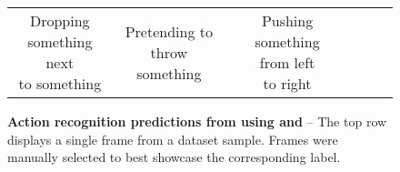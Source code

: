 \begin{figure*}[t]
\begin{tabular}{cccccc}
    \makecell{Dropping\\something next\\to something} &
    \makecell{Pretending to\\throw something} &
    \makecell{Pushing something\\from left\\to right} \\[10mm]
\end{tabular}
\vspace{-5mm}
\caption{
\textbf{Action recognition predictions from \Tssv using \iwalt and \vwalt} -- The top row displays a single frame from a dataset sample. Frames were manually selected to best showcase the corresponding label.
}
\vspace{-4mm}
\label{fig:qualitative_ssv2}
\end{figure*}
